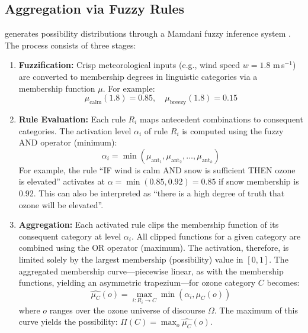 \subsection{Aggregation via Fuzzy Rules}\label{sec:fuzzy_aggregation}
\clyfar{} generates possibility distributions through a Mamdani fuzzy inference system \citep{Mamdani1976-pp}. The process consists of three stages:

\begin{enumerate}[leftmargin=2em]
\item \textbf{Fuzzification:} Crisp meteorological inputs (e.g., wind speed $w = 1.8$ m\,s$^{-1}$) are converted to membership degrees in linguistic categories via a membership function $\mu$. For example:
\begin{equation}
\mu_{\text{calm}}(1.8) = 0.85, \quad \mu_{\text{breezy}}(1.8) = 0.15
\end{equation}

\item \textbf{Rule Evaluation:} Each rule $R_i$ maps antecedent combinations to consequent categories. The activation level $\alpha_i$ of rule $R_i$ is computed using the fuzzy AND operator (minimum):
\begin{equation}
\alpha_i = \min(\mu_{\text{ant}_1}, \mu_{\text{ant}_2}, \ldots, \mu_{\text{ant}_k}) \label{eq:rule_activation}
\end{equation}
For example, the rule ``IF wind is calm AND snow is sufficient THEN ozone is elevated'' activates at $\alpha = \min(0.85, 0.92) = 0.85$ if snow membership is 0.92. This can also be interpreted as ``there is a high degree of truth that ozone will be elevated''.

\item \textbf{Aggregation:} Each activated rule clips the membership function of its consequent category at level $\alpha_i$. All clipped functions for a given category are combined using the OR operator (maximum). The activation, therefore, is limited solely by the largest membership (possibility) value in $[0,1]$. The aggregated membership curve---piecewise linear, as with the membership functions, yielding an asymmetric trapezium---for ozone category $C$ becomes:
\begin{equation}
\widehat{\mu_C}(o) = \max_{i: R_i \to C} \min(\alpha_i, \mu_C(o)) \label{eq:aggregation}
\end{equation}
where $o$ ranges over the ozone universe of discourse $\Omega$. The maximum of this curve yields the possibility: $\Pi(C) = \max_{o} \widehat{\mu_C}(o)$.
\end{enumerate}

